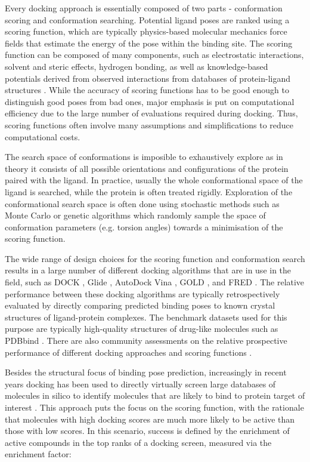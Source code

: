 Every docking approach is essentially composed of two parts - conformation scoring and conformation searching. Potential ligand poses are ranked using a scoring function, which are typically physics-based molecular mechanics force fields that estimate the energy of the pose within the binding site. The scoring function can be composed of many components, such as electrostatic interactions, solvent and steric effects, hydrogen bonding, as well as knowledge-based potentials derived from observed interactions from databases of protein-ligand structures \cite{Li2019scoring}. While the accuracy of scoring functions has to be good enough to distinguish good poses from bad ones, major emphasis is put on computational efficiency due to the large number of evaluations required during docking. Thus, scoring functions often involve many assumptions and simplifications to reduce computational costs.

The search space of conformations is imposible to exhaustively explore as in theory it consists of all possible orientations and configurations of the protein paired with the ligand. In practice, usually the whole conformational space of the ligand is searched, while the protein is often treated rigidly. Exploration of the conformational search space is often done using stochastic methods such as Monte Carlo or genetic algorithms which randomly sample the space of conformation parameters (e.g. torsion angles) towards a minimisation of the scoring function.

The wide range of design choices for the scoring function and conformation search results in a large number of different docking algorithms that are in use in the field, such as DOCK \cite{Coleman2013DOCK}, Glide \cite{friesner2004glide}, AutoDock Vina \cite{Eberhardt2021Vina}, GOLD \cite{Verdonk2003Gold}, and FRED \cite{McGann2012FRED}. The relative performance between these docking algorithms are typically retrospectively evaluated by directly comparing predicted binding poses to known crystal structures of ligand-protein complexes. The benchmark datasets used for this purpose are typically high-quality structures of drug-like molecules such as PDBbind \cite{Wang2004PDBbind,Liu2014PDBbind}. There are also community assessments on the relative prospective performance of different docking approaches \cite{Parks2020D3R} and scoring functions \cite{Su2019CASF}.

Besides the structural focus of binding pose prediction, increasingly in recent years docking has been used to directly virtually screen large databases of molecules in silico to identify molecules that are likely to bind to protein target of interest \cite{Bender2021LargeScaleDocking}. This approach puts the focus on the scoring function, with the rationale that molecules with high docking scores are much more likely to be active than those with low scores. In this scenario, success is defined by the enrichment of active compounds in the top ranks of a docking screen, measured via the enrichment factor:

